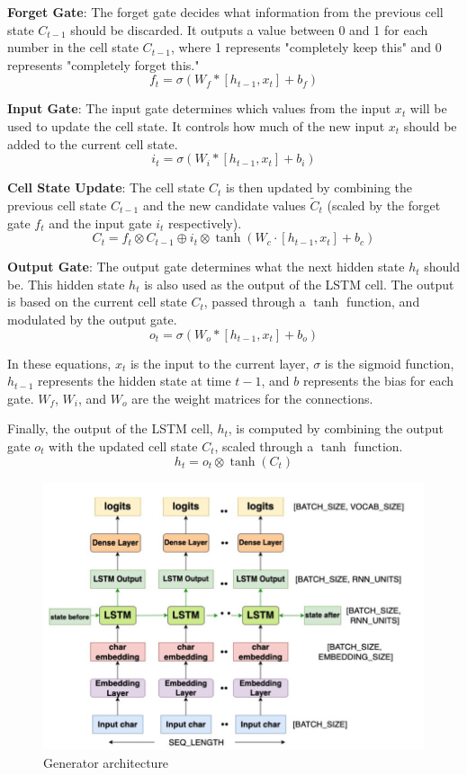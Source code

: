 \textbf{Forget Gate}: The forget gate decides what information from the previous cell state \(C_{t-1}\) should be discarded. It outputs a value between 0 and 1 for each number in the cell state \(C_{t-1}\), where 1 represents "completely keep this" and 0 represents "completely forget this."
\[f_t = \sigma(W_f*[h_{t-1},x_t] + b_f)\]

\textbf{Input Gate}: The input gate determines which values from the input \(x_t\) will be used to update the cell state. It controls how much of the new input \(x_t\) should be added to the current cell state. 
\[i_t = \sigma(W_i*[h_{t-1},x_t] + b_i)\]

\textbf{Cell State Update}: The cell state \(C_t\) is then updated by combining the previous cell state \(C_{t-1}\) and the new candidate values \(\tilde{C}_t\) (scaled by the forget gate \(f_t\) and the input gate \(i_t\) respectively).
\[
C_t = f_t \otimes C_{t-1} \oplus i_t \otimes \tanh(W_c \cdot [h_{t-1}, x_t] + b_c)
\]

\textbf{Output Gate}: The output gate determines what the next hidden state \(h_t\) should be. This hidden state \(h_t\) is also used as the output of the LSTM cell. The output is based on the current cell state \(C_t\), passed through a \(\tanh\) function, and modulated by the output gate.
\[o_t = \sigma(W_o*[h_{t-1},x_t] + b_o)\]

In these equations, \(x_t\) is the input to the current layer, \(\sigma\) is the sigmoid function, \(h_{t-1}\) represents the hidden state at time \(t-1\), and \(b\) represents the bias for each gate. \(W_f\), \(W_i\), and \(W_o\) are the weight matrices for the connections.

Finally, the output of the LSTM cell, \(h_t\), is computed by combining the output gate \(o_t\) with the updated cell state \(C_t\), scaled through a \(\tanh\) function.
\[
h_t = o_t \otimes \tanh(C_t)
\]

\begin{figure}[htp]
    \centering
    \includegraphics[width=0.8\linewidth]{images/generator_structure2.png}
    \caption{Generator architecture}
    \label{fig:Generator architecture}
\end{figure}

